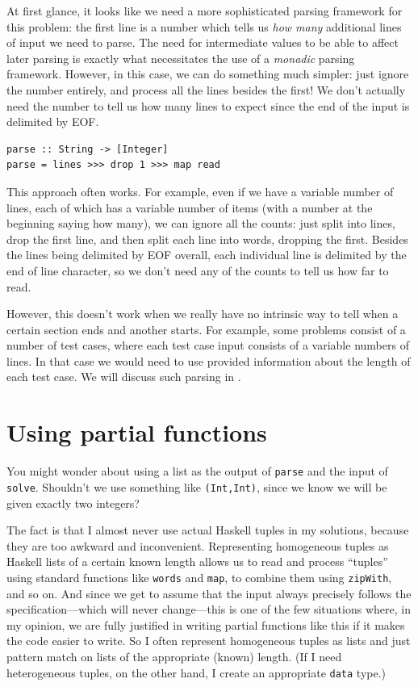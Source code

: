 \documentclass{book}
\newcommand{\pref}[1]{\prettyref{#1}}
\newcommand{\h}[1]{\texttt{#1}}
\begin{document}
At first glance, it looks like we need a more sophisticated parsing
framework for this problem: the first line is a number which tells us
\emph{how many} additional lines of input we need to parse.  The need
for intermediate values to be able to affect later parsing is exactly
what necessitates the use of a \emph{monadic} parsing framework.
However, in this case, we can do something much simpler: just ignore
the number entirely, and process all the lines besides the first!  We
don't actually need the number to tell us how many lines to expect
since the end of the input is delimited by EOF.

\begin{verbatim}
parse :: String -> [Integer]
parse = lines >>> drop 1 >>> map read
\end{verbatim}

This approach often works. For example, even if we have a variable
number of lines, each of which has a variable number of items (with a
number at the beginning saying how many), we can ignore all the
counts: just split into lines, drop the first line, and then split
each line into words, dropping the first.  Besides the lines being
delimited by EOF overall, each individual line is delimited by the end
of line character, so we don't need any of the counts to tell us how
far to read.

However, this doesn't work when we really have no intrinsic way to
tell when a certain section ends and another starts.  For example,
some problems consist of a number of test cases, where each test case
input consists of a variable numbers of lines. In that case we would
need to use provided information about the length of each test case.
We will discuss such parsing in \pref{chap:parsing}.

\section{Using partial functions}
\label{sec:partial}

You might wonder about using a list as the output of \h{parse} and the
input of \h{solve}.  Shouldn't we use something like \h{(Int,Int)}, since
we know we will be given exactly two integers? 

The fact is that I almost never use actual Haskell tuples in my
solutions, because they are too awkward and inconvenient. Representing
homogeneous tuples as Haskell lists of a certain known length allows
us to read and process ``tuples'' using standard functions like
\h{words} and \h{map}, to combine them using \h{zipWith}, and so on.
And since we get to assume that the input always precisely follows the
specification---which will never change---this is one of the few
situations where, in my opinion, we are fully justified in writing
partial functions like this if it makes the code easier to write.  So
I often represent homogeneous tuples as lists and just pattern match
on lists of the appropriate (known) length.  (If I need heterogeneous
tuples, on the other hand, I create an appropriate \h{data} type.)
\end{document}
